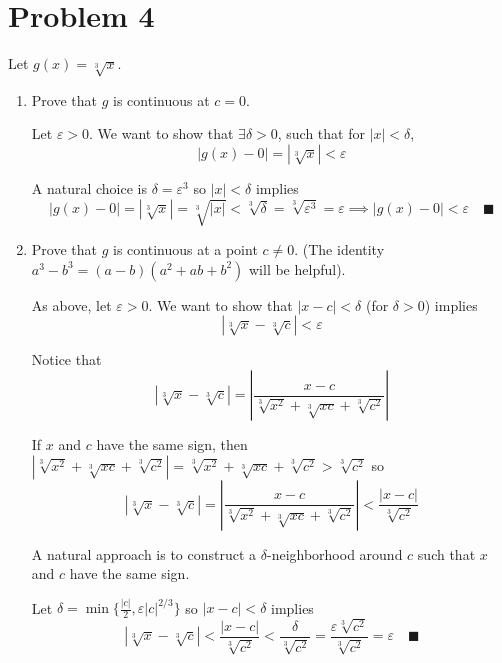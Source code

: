 \documentclass[12pt]{article}
\newcommand{\qed}{\quad \blacksquare}
\newcommand{\abs}[1]{\left\vert #1 \right\vert}
\newcommand{\ep}{\varepsilon}
\begin{document}
\section*{Problem 4}
Let $g(x)=\sqrt[3]{x}$.
\begin{enumerate}
	\item Prove that $g$ is continuous at $c=0$. 
	
        \color{blue}
            Let $\ep > 0$. We want to show that $\exists \delta > 0$, such that for $\abs{x} < \delta$,
            \[\abs{g(x) - 0} = \abs{\sqrt[3]{x}} < \ep\]

            A natural choice is $\delta = \ep^3$ so $\abs{x} < \delta$ implies 
            \[\abs{g(x) - 0} = \abs{\sqrt[3]{x}} = \sqrt[3]{\abs{x}} < \sqrt[3]{\delta} = \sqrt[3]{\ep^3} = \ep \implies \abs{g(x) - 0} < \ep \qed\]
        \color{black}

	\item Prove that $g$ is continuous at a point $c\neq0$. (The identity $a^3-b^3=(a-b)(a^2+ab+b^2)$ will be helpful).
    
        \color{blue}
            As above, let $\ep > 0$. We want to show that $\abs{x - c} < \delta$ (for $\delta > 0$) implies 
            \[\abs{\sqrt[3]{x} - \sqrt[3]{c}} < \ep\]

            Notice that 
            \[\abs{\sqrt[3]{x} - \sqrt[3]{c}} = \abs{\frac{x - c}{\sqrt[3]{x^2} + \sqrt[3]{xc} + \sqrt[3]{c^2}}}\] 

            If $x$ and $c$ have the same sign, then $\abs{\sqrt[3]{x^2} + \sqrt[3]{xc} + \sqrt[3]{c^2}} = \sqrt[3]{x^2} + \sqrt[3]{xc} + \sqrt[3]{c^2} > \sqrt[3]{c^2}$ so 
            \[\abs{\sqrt[3]{x} - \sqrt[3]{c}} = \abs{\frac{x - c}{\sqrt[3]{x^2} + \sqrt[3]{xc} + \sqrt[3]{c^2}}} < \frac{\abs{x-c}}{\sqrt[3]{c^2}}\] 

            A natural approach is to construct a $\delta$-neighborhood around $c$ such that $x$ and $c$ have the same sign. 

            Let $\delta = \min\{\frac{\abs{c}}{2}, \ep \abs{c}^{2/3}\}$ so $\abs{x - c} < \delta$ implies
            \[\abs{\sqrt[3]{x} - \sqrt[3]{c}} < \frac{\abs{x- c}}{\sqrt[3]{c^2}} < \frac{\delta}{\sqrt[3]{c^2}} = \frac{\ep \sqrt[3]{c^2}}{\sqrt[3]{c^2}} = \ep \qed\]
                
        \color{black}

\end{enumerate}

\pagebreak
\end{document}

